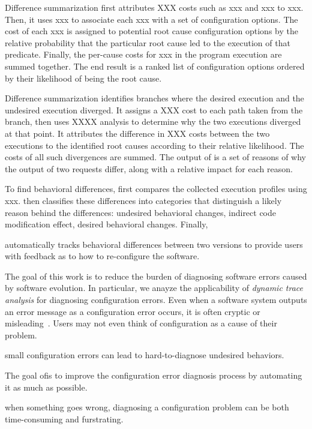 
Difference summarization first attributes XXX costs
such as xxx and xxx to xxx. Then, it uses xxx to
associate each xxx with a set of configuration options.
The cost of each xxx is assigned to potential
root cause configuration options by the relative
probability that the particular root cause
led to the execution of that predicate. Finally,
the per-cause costs for xxx in the program execution are
summed together. The end result is a ranked
list of configuration options ordered by
their likelihood of being the root cause.

Difference summarization identifies branches where the
desired execution and the undesired execution diverged.
It assigns a XXX cost to each path taken from the branch,
then uses XXXX analysis to determine why the
two executions diverged at that point. It attributes
the difference in XXX costs between the
two executions to the identified root causes according to their
relative likelihood. The costs of all such divergences are
summed. The output of \ourtool is a set of reasons of why
the output of two requests differ, along with a
relative impact for each reason.


To find behavioral differences, \ourtool first compares the collected
execution profiles using xxx. \ourtool then classifies these
differences into categories that distinguish a likely
reason behind the differences: undesired behavioral changes,
indirect code modification effect,
desired behavioral changes. Finally, 


\ourtool automatically tracks behavioral differences between two
versions to provide users with feedback as to how to re-configure
the software.


The goal of this work is to reduce the burden
of diagnosing software errors caused by software evolution. 
In particular, we anayze the applicability of
\textit{dynamic trace analysis} for diagnosing configuration
errors.
Even when a software system outputs an error message
as a configuration error occurs,
it is often cryptic or misleading~\cite{}. Users may not
even think of configuration as a cause of their problem.

small configuration errors can lead to hard-to-diagnose
undesired behaviors. 

The goal of\ourtool is to improve the configuration error diagnosis
process by automating it as much as possible.

when something goes wrong,
diagnosing a configuration problem can be both
time-consuming and furstrating.

